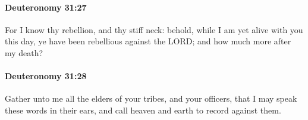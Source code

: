 		\paragraph{Deuteronomy 31:27} %
			\label{DEUTERONOMY-31-27}

			For I know thy rebellion, and thy stiff neck: behold, while I am yet alive with you this day, ye have been rebellious against the LORD; and how much more after my death?


		\paragraph{Deuteronomy 31:28} %
			\label{DEUTERONOMY-31-28}

			Gather unto me all the elders of your tribes, and your officers, that I may speak these words in their ears, and call heaven and earth to record against them.


